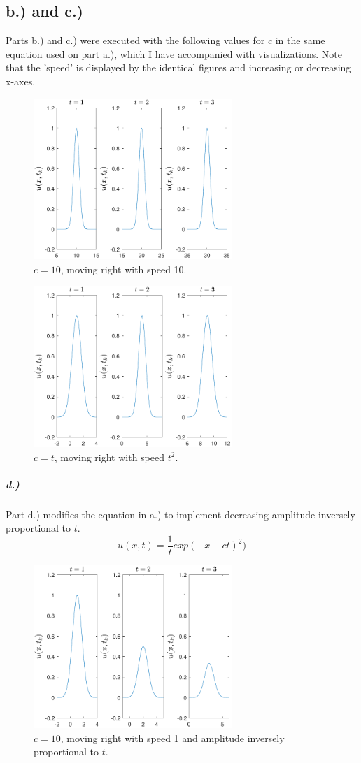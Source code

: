 \documentclass{article}
\begin{document}
\subsection*{b.) and c.)}
Parts b.) and c.) were executed with the following values for $c$ in the same equation used on part a.), which I have accompanied with visualizations. Note that the 'speed' is displayed by the identical figures and increasing or decreasing x-axes.
\begin{figure}[H]
\centering
    \includegraphics[width=75mm, scale=.8]{plot_1b.pdf}
	\caption{$c = 10$, moving right with speed 10.}
\end{figure}
\begin{figure}[H]
\centering
    \includegraphics[width=75mm, scale=.8]{plot_1c.pdf}
	\caption{$c = t$, moving right with speed $t^{2}$.}
\end{figure}
\subparagraph*{d.)} Part d.) modifies the equation in a.) to implement decreasing amplitude inversely proportional to $t$.
\begin{equation}
u(x,t) = \frac{1}{t}exp(-x - ct)^2) 
\end{equation}

\begin{figure}[H]
\centering
    \includegraphics[width=75mm, scale=.8]{plot_1d.pdf}
	\caption{$c = 10$, moving right with speed 1 and amplitude inversely proportional to $t$.}
\end{figure}
\end{document}
